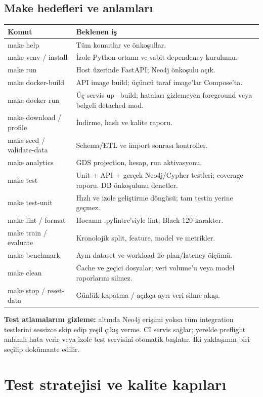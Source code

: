 \documentclass[11pt,a4paper]{article}
\newcommand{\code}[1]{\texttt{\detokenize{#1}}}
\begin{document}
\subsection{Make hedefleri ve anlamları}
\small
\begin{longtable}{@{}P{43mm}P{104mm}@{}}\toprule
\textbf{Komut} & \textbf{Beklenen iş}\\\midrule\endhead
make help & Tüm komutlar ve önkoşullar.\\
make venv / install & İzole Python ortamı ve sabit dependency kurulumu.\\
make run & Host üzerinde FastAPI; Neo4j önkoşulu açık.\\
make docker-build & API image build; üçüncü taraf image'lar Compose'ta.\\
make docker-run & Üç servis up --build; hataları gizlemeyen foreground veya belgeli detached mod.\\
make download / profile & İndirme, hash ve kalite raporu.\\
make seed / validate-data & Schema/ETL ve import sonrası kontroller.\\
make analytics & GDS projection, hesap, run aktivasyonu.\\
make test & Unit + API + gerçek Neo4j/Cypher testleri; coverage raporu. DB önkoşulunu denetler.\\
make test-unit & Hızlı ve izole geliştirme döngüsü; tam testin yerine geçmez.\\
make lint / format & Hocanın .pylintrc'siyle lint; Black 120 karakter.\\
make train / evaluate & Kronolojik split, feature, model ve metrikler.\\
make benchmark & Aynı dataset ve workload ile plan/latency ölçümü.\\
make clean & Cache ve geçici dosyalar; veri volume'u veya model raporlarını silmez.\\
make stop / reset-data & Günlük kapatma / açıkça ayrı veri silme akışı.\\\bottomrule
\end{longtable}\normalsize
\textbf{Test atlamalarını gizleme:} \code{make test} altında Neo4j erişimi yoksa tüm integration testlerini sessizce skip edip yeşil çıkış verme. CI servis sağlar; yerelde preflight anlamlı hata verir veya izole test servisini otomatik başlatır. İki yaklaşımın biri seçilip dokümante edilir.

\section{Test stratejisi ve kalite kapıları}
\end{document}
